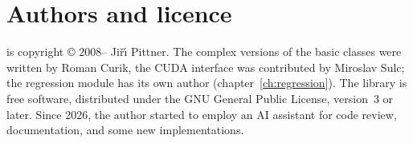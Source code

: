 \section{Authors and licence}

\LA{} is copyright \copyright{} 2008-- Ji\v{r}\'{\i} Pittner. The complex versions of the basic classes were
written by Roman Curik, the CUDA interface was contributed by Miroslav Sulc; the regression module
has its own author (chapter~\ref{ch:regression}). The library is free software, distributed under the
GNU General Public License, version~3 or later.
Since 2026, the author started to employ an AI assistant for code review, documentation, and some new implementations.
